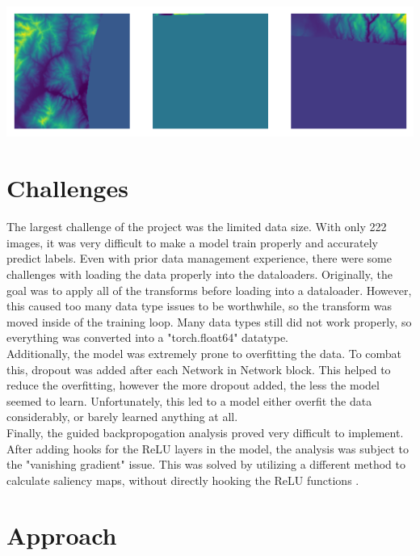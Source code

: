 \documentclass{article}[12pt]
\begin{document}
\begin{center}
    \includegraphics[width=1\textwidth]{images/low_data.png}
\end{center}

\section*{Challenges}

\indent
The largest challenge of the project was the limited data size. With only 222 images, it was very difficult to make a model train properly and accurately predict labels. Even with prior data management experience, there were some challenges with loading the data properly into the dataloaders. Originally, the goal was to apply all of the transforms before loading into a dataloader. However, this caused too many data type issues to be worthwhile, so the transform was moved inside of the training loop. Many data types still did not work properly, so everything was converted into a "torch.float64" datatype.\\
\indent
Additionally, the model was extremely prone to overfitting the data. To combat this, dropout was added after each Network in Network block. This helped to reduce the overfitting, however the more dropout added, the less the model seemed to learn. Unfortunately, this led to a model either overfit the data considerably, or barely learned anything at all.\\
\indent
Finally, the guided backpropogation analysis proved very difficult to implement. After adding hooks for the ReLU layers in the model, the analysis was subject to the "vanishing gradient" issue. This was solved by utilizing a different method to calculate saliency maps, without directly hooking the ReLU functions \cite{saliency}.\\



\section*{Approach}
\end{document}
